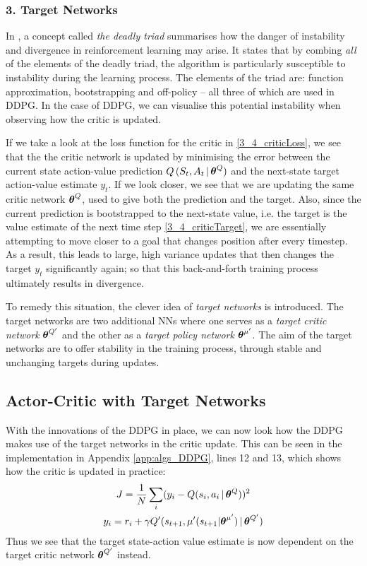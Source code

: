 \subsubsection{3. Target Networks}
In \cite{suttonAndBartoBook}, a concept called \textit{the deadly triad} summarises how the danger of instability and divergence in reinforcement learning may arise. It states that by combing \textit{all} of the elements of the deadly triad, the algorithm is particularly susceptible to instability during the learning process.
The elements of the triad are: function approximation, bootstrapping and off-policy -- all three of which are used in DDPG.
In the case of DDPG, we can visualise this potential instability when observing how the critic is updated. 

If we take a look at the loss function for the critic in \eqref{3_4_criticLoss}, we see that the the critic network is updated by minimising the error between the current state action-value prediction $Q\,(S_t, A_t  \,| \,\boldsymbol{\theta}^Q )$ and the next-state target action-value estimate $y_t$. If we look closer, we see that we are updating the same critic network $\boldsymbol{\theta}^Q$, used to give both the prediction and the target. Also, since the current prediction is bootstrapped to the next-state value, i.e. the target is the value estimate of the next time step \eqref{3_4_criticTarget}, we are essentially attempting to move closer to a goal that changes position after every timestep.
As a result, this leads to large, high variance updates that then changes the target $y_t$ significantly again; so that this back-and-forth training process ultimately results in divergence. 

To remedy this situation, the clever idea of \textit{target networks} is introduced. The target networks are two additional NNs where one serves as a \textit{target critic network} $\boldsymbol{\theta}^{Q'}$ and the other as a \textit{target policy network} $\boldsymbol{\theta}^{\mu'}$.
The aim of the target networks are to offer stability in the training process, through stable and unchanging targets during updates. 


\subsection{Actor-Critic with Target Networks}
With the innovations of the DDPG in place, we can now look how the DDPG makes use of the target networks in the critic update. This can be seen in the implementation in Appendix \ref{app:algs_DDPG}, lines 12 and 13, which shows how the critic is updated in practice:
\begin{gather}
    J = \frac{1}{N} \sum_i (y_i - Q(s_i, a_i \,|\, \boldsymbol{\theta}^Q))^2 \label{3_4_NewcriticLoss} \\
    y_i = r_i + \gamma Q'(s_{t+1}, \mu'( s_{t+1}| \boldsymbol{\theta}^{\mu'}) \,|\, \boldsymbol{\theta}^{Q'} ) \label{3_4_NewcriticTarget}
\end{gather}
Thus we see that the target state-action value estimate is now dependent on the target critic network $\boldsymbol{\theta}^{Q'}$ instead.

